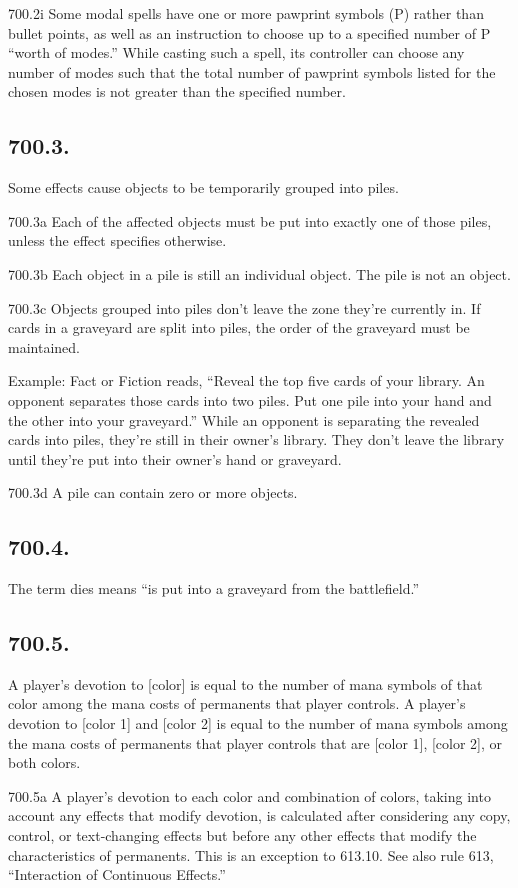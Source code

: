 700.2i Some modal spells have one or more pawprint symbols ({P}) rather than bullet points, as well as an instruction to choose up to a specified number of {P} “worth of modes.” While casting such a spell, its controller can choose any number of modes such that the total number of pawprint symbols listed for the chosen modes is not greater than the specified number.

\subsection*{700.3.}
Some effects cause objects to be temporarily grouped into piles.

700.3a Each of the affected objects must be put into exactly one of those piles, unless the effect specifies otherwise.

700.3b Each object in a pile is still an individual object. The pile is not an object.

700.3c Objects grouped into piles don’t leave the zone they’re currently in. If cards in a graveyard are split into piles, the order of the graveyard must be maintained.

Example: Fact or Fiction reads, “Reveal the top five cards of your library. An opponent separates those cards into two piles. Put one pile into your hand and the other into your graveyard.” While an opponent is separating the revealed cards into piles, they’re still in their owner’s library. They don’t leave the library until they’re put into their owner’s hand or graveyard.

700.3d A pile can contain zero or more objects.

\subsection*{700.4.}
The term dies means “is put into a graveyard from the battlefield.”

\subsection*{700.5.}
A player’s devotion to [color] is equal to the number of mana symbols of that color among the mana costs of permanents that player controls. A player’s devotion to [color 1] and [color 2] is equal to the number of mana symbols among the mana costs of permanents that player controls that are [color 1], [color 2], or both colors.

700.5a A player’s devotion to each color and combination of colors, taking into account any effects that modify devotion, is calculated after considering any copy, control, or text-changing effects but before any other effects that modify the characteristics of permanents. This is an exception to 613.10. See also rule 613, “Interaction of Continuous Effects.”

